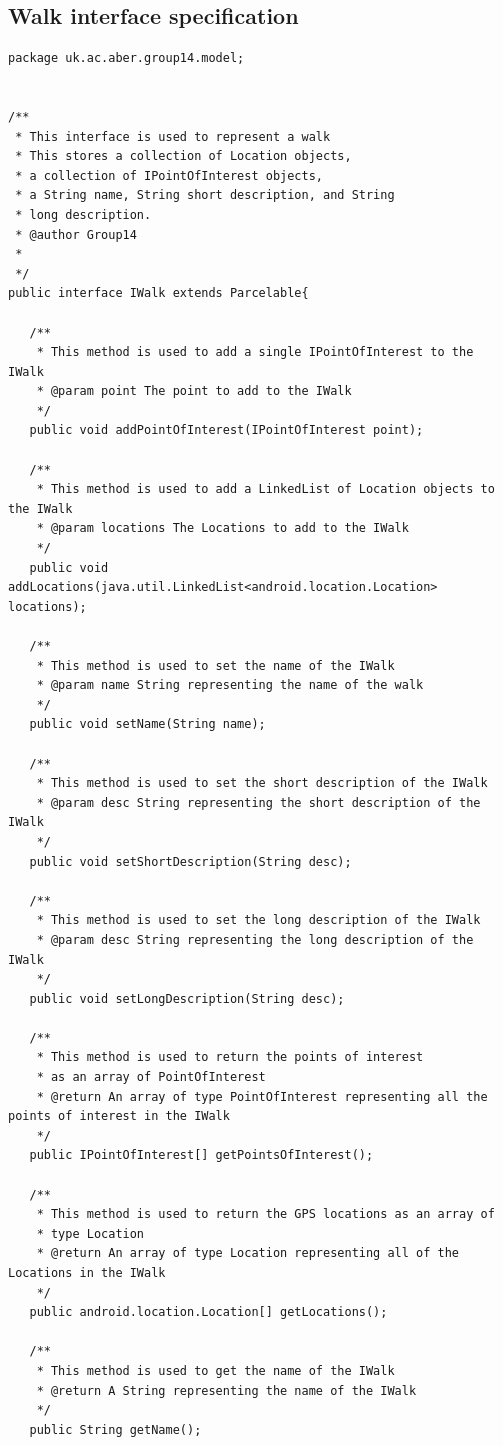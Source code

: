 \documentclass{project}
\begin{document}
\subsection{Walk interface specification}
\begin{verbatim}
package uk.ac.aber.group14.model;


/**
 * This interface is used to represent a walk
 * This stores a collection of Location objects,
 * a collection of IPointOfInterest objects,
 * a String name, String short description, and String
 * long description.
 * @author Group14
 *
 */
public interface IWalk extends Parcelable{

   /**
    * This method is used to add a single IPointOfInterest to the IWalk
    * @param point The point to add to the IWalk
    */
   public void addPointOfInterest(IPointOfInterest point);
   
   /**
    * This method is used to add a LinkedList of Location objects to the IWalk
    * @param locations The Locations to add to the IWalk
    */
   public void addLocations(java.util.LinkedList<android.location.Location> locations);
   
   /**
    * This method is used to set the name of the IWalk
    * @param name String representing the name of the walk
    */
   public void setName(String name);
   
   /**
    * This method is used to set the short description of the IWalk
    * @param desc String representing the short description of the IWalk
    */
   public void setShortDescription(String desc);
   
   /**
    * This method is used to set the long description of the IWalk
    * @param desc String representing the long description of the IWalk
    */
   public void setLongDescription(String desc);
   
   /**
    * This method is used to return the points of interest
    * as an array of PointOfInterest
    * @return An array of type PointOfInterest representing all the points of interest in the IWalk
    */
   public IPointOfInterest[] getPointsOfInterest();
   
   /**
    * This method is used to return the GPS locations as an array of
    * type Location
    * @return An array of type Location representing all of the Locations in the IWalk
    */
   public android.location.Location[] getLocations();
   
   /**
    * This method is used to get the name of the IWalk
    * @return A String representing the name of the IWalk
    */
   public String getName();
   

\end{verbatim}
\end{document}
